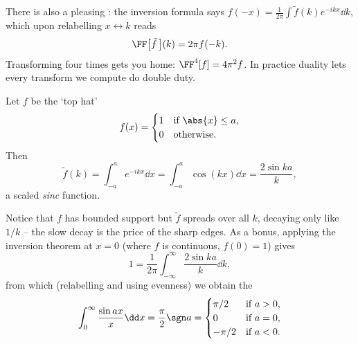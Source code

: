 There is also a pleasing : the inversion formula says $f(-x) = \frac{1}{2\pi}\int \tilde f(k) e^{-ikx} \dd k$, which upon relabelling $x \leftrightarrow k$ reads
$$
\FF\big[\tilde{f}\,\big](k) = 2 \pi f(-k).
$$
Transforming four times gets you home: $\FF^4[f] = 4\pi^2 f$. In practice duality lets every transform we compute do double duty.

\begin{example}
    Let $f$ be the `top hat'
    $$
    f(x) = \begin{cases}
        1 &\mbox{if } \abs{x} \leq a, \\
        0 &\mbox{otherwise}.
    \end{cases}
    $$
    Then
    $$
    \tilde{f}(k) = \int_{-a}^{a} e^{-ikx} \dd x = \int_{-a}^a \cos (kx) \dd x = \frac{2 \sin ka}{k},
    $$
    a scaled \emph{sinc} function.

    \begin{center}
    \end{center}

    Notice that $f$ has bounded support but $\tilde f$ spreads over all $k$, decaying only like $1/k$ -- the slow decay is the price of the sharp edges. As a bonus, applying the inversion theorem at $x = 0$ (where $f$ is continuous, $f(0) = 1$) gives
    $$
    1 = \frac{1}{2\pi}\int_{-\infty}^{\infty} \frac{2 \sin ka}{k} \dd k,
    $$
    from which (relabelling and using evenness) we obtain the 
    $$
    \int_0^{\infty} \frac{\sin a x}{x} \dd x = \frac{\pi}{2}\sgn a = \begin{cases}
        \pi/2 &\mbox{if } a > 0, \\
        0 &\mbox{if } a = 0, \\
        -\pi/2 &\mbox{if } a < 0.
    \end{cases}
    $$
\end{example}

